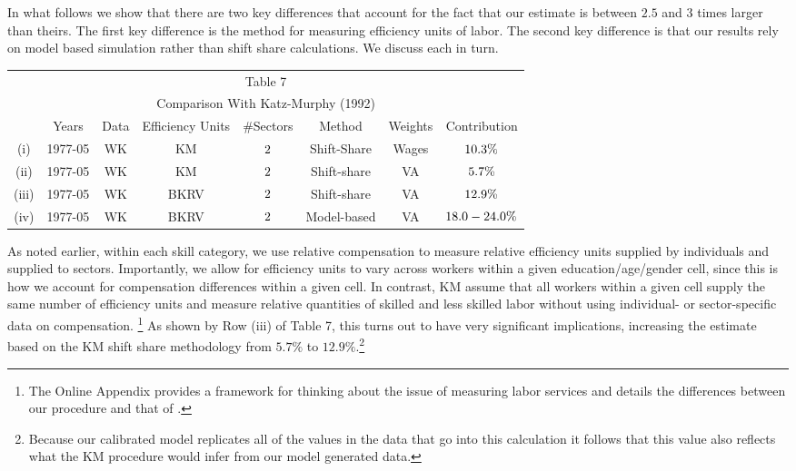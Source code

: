 \documentclass[12pt,english]{article}
\begin{document}
{\normalsize In what follows we show that there are two key differences that
account for the fact that our estimate is between $2.5$ and $3$ times larger
than theirs. The first key difference is the method for measuring efficiency
units of labor. The second key difference is that our results rely on model
based simulation rather than shift share calculations. We discuss each in
turn. }

\begin{center}
{\normalsize 
\begin{tabular}{cccccccc}
\multicolumn{8}{c}{\small Table 7} \\ 
\multicolumn{8}{c}{\small Comparison With Katz-Murphy (1992)} \\ \hline
& {\small Years} & {\small Data} & {\small Efficiency Units} & {\small %
\#Sectors} & {\small Method} & {\small Weights} & {\small Contribution } \\ 
\hline
(i) & {\small 1977-05} & {\small WK} & {\small KM} & ${\small 2}$ & {\small %
Shift-Share} & {\small Wages} & ${\small 10.3\%}$ \\ 
{\small (ii)} & {\small 1977-05} & {\small WK} & {\small KM} & ${\small 2}$
& {\small Shift-share} & {\small VA} & ${\small 5.7\%}$ \\ 
{\small (iii)} & {\small 1977-05} & {\small WK} & {\small BKRV} & ${\small 2}
$ & {\small Shift-share} & {\small VA} & ${\small 12.9\%}$ \\ 
{\small (iv)} & {\small 1977-05} & {\small WK} & {\small BKRV} & ${\small 2}$
& {\small Model-based} & {\small VA} & ${\small 18.0-24.0\%}$ \\ \hline
\end{tabular}%
\medskip \vspace{-7.5mm} \bigskip }
\end{center}

{\normalsize As noted earlier, within each skill category, we use relative
compensation to measure relative efficiency units supplied by individuals
and supplied to sectors. Importantly, we allow for efficiency units to vary
across workers within a given education/age/gender cell, since this is how
we account for compensation differences within a given cell. In contrast, KM
assume that all workers within a given cell supply the same number of
efficiency units and measure relative quantities of skilled and less skilled
labor without using individual- or sector-specific data on compensation.%
\footnote{%
The Online Appendix provides a framework for thinking about the issue of
measuring labor services and details the differences between our procedure
and that of \citet{KatMur92}.} As shown by Row (iii) of Table 7, this turns
out to have very significant implications, increasing the estimate based on
the KM shift share methodology from $5.7\%$ to $12.9\%$.\footnote{%
Because our calibrated model replicates all of the values in the data that
go into this calculation it follows that this value also reflects what the
KM procedure would infer from our model generated data.} }
\end{document}
